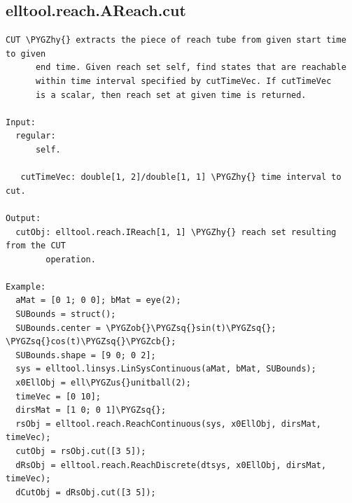 \documentclass[letterpaper,10pt,english]{sphinxmanual}
\def\PYGZus{\char`\_}
\def\PYGZob{\char`\{}
\def\PYGZcb{\char`\}}
\def\PYGZhy{\char`\-}
\def\PYGZsq{\char`\'}
\begin{document}
\subsection{elltool.reach.AReach.cut}
\label{chap_functions:elltool-reach-areach-cut}
\begin{Verbatim}[commandchars=\\\{\}]
CUT \PYGZhy{} extracts the piece of reach tube from given start time to given
      end time. Given reach set self, find states that are reachable
      within time interval specified by cutTimeVec. If cutTimeVec
      is a scalar, then reach set at given time is returned.

Input:
  regular:
      self.

   cutTimeVec: double[1, 2]/double[1, 1] \PYGZhy{} time interval to cut.

Output:
  cutObj: elltool.reach.IReach[1, 1] \PYGZhy{} reach set resulting from the CUT
        operation.

Example:
  aMat = [0 1; 0 0]; bMat = eye(2);
  SUBounds = struct();
  SUBounds.center = \PYGZob{}\PYGZsq{}sin(t)\PYGZsq{}; \PYGZsq{}cos(t)\PYGZsq{}\PYGZcb{};
  SUBounds.shape = [9 0; 0 2];
  sys = elltool.linsys.LinSysContinuous(aMat, bMat, SUBounds);
  x0EllObj = ell\PYGZus{}unitball(2);
  timeVec = [0 10];
  dirsMat = [1 0; 0 1]\PYGZsq{};
  rsObj = elltool.reach.ReachContinuous(sys, x0EllObj, dirsMat, timeVec);
  cutObj = rsObj.cut([3 5]);
  dRsObj = elltool.reach.ReachDiscrete(dtsys, x0EllObj, dirsMat, timeVec);
  dCutObj = dRsObj.cut([3 5]);
\end{Verbatim}
\end{document}
